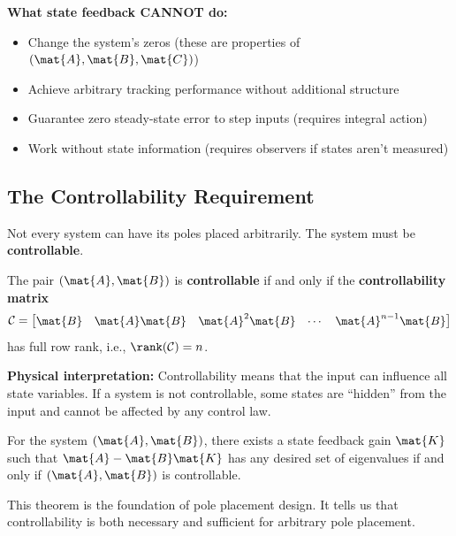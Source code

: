 \textbf{What state feedback CANNOT do:}
\begin{itemize}
    \item Change the system's zeros (these are properties of $(\mat{A}, \mat{B}, \mat{C})$)
    \item Achieve arbitrary tracking performance without additional structure
    \item Guarantee zero steady-state error to step inputs (requires integral action)
    \item Work without state information (requires observers if states aren't measured)
\end{itemize}

\subsection{The Controllability Requirement}

Not every system can have its poles placed arbitrarily. The system must be \textbf{controllable}.

\begin{definition}[Controllability]
The pair $(\mat{A}, \mat{B})$ is \textbf{controllable} if and only if the \textbf{controllability matrix}
\begin{equation}
\mathcal{C} = \begin{bmatrix} \mat{B} & \mat{A}\mat{B} & \mat{A}^2\mat{B} & \cdots & \mat{A}^{n-1}\mat{B} \end{bmatrix}
\label{eq:controllability_matrix}
\end{equation}
has full row rank, i.e., $\rank(\mathcal{C}) = n$.
\end{definition}

\textbf{Physical interpretation:} Controllability means that the input can influence all state variables. If a system is not controllable, some states are ``hidden'' from the input and cannot be affected by any control law.

\begin{theorem}
\label{thm:pole_placement_existence}
For the system $(\mat{A}, \mat{B})$, there exists a state feedback gain $\mat{K}$ such that $\mat{A} - \mat{B}\mat{K}$ has any desired set of eigenvalues if and only if $(\mat{A}, \mat{B})$ is controllable.
\end{theorem}

This theorem is the foundation of pole placement design. It tells us that controllability is both necessary and sufficient for arbitrary pole placement.

